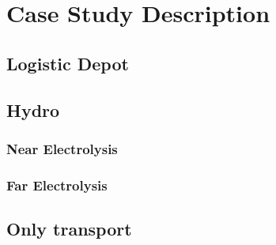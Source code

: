 \newpage
\chapter{Case Study Description}






\section{Logistic Depot}
\section{Hydro}
\subsection{Near Electrolysis}
\subsection{Far Electrolysis}
\section{Only transport}
